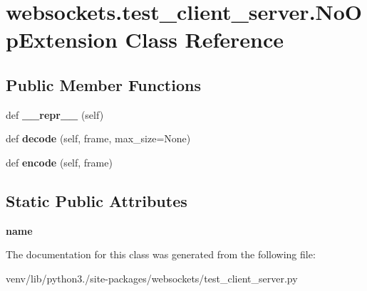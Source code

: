 \hypertarget{classwebsockets_1_1test__client__server_1_1_no_op_extension}{}\section{websockets.\+test\+\_\+client\+\_\+server.\+No\+Op\+Extension Class Reference}
\label{classwebsockets_1_1test__client__server_1_1_no_op_extension}
\subsection*{Public Member Functions}
\begin{DoxyCompactItemize}
\item 
\mbox{\label{classwebsockets_1_1test__client__server_1_1_no_op_extension_ad2e1f5664b59bcc5dd8af28bbd21e7e7}} 
def {\bfseries \+\_\+\+\_\+repr\+\_\+\+\_\+} (self)
\item 
\mbox{\label{classwebsockets_1_1test__client__server_1_1_no_op_extension_af09b1c01ae6027d4526010300760d39d}} 
def {\bfseries decode} (self, frame, max\+\_\+size=None)
\item 
\mbox{\label{classwebsockets_1_1test__client__server_1_1_no_op_extension_a6f7a2a6f5b87875ac4994dc9ef2e4f3e}} 
def {\bfseries encode} (self, frame)
\end{DoxyCompactItemize}
\subsection*{Static Public Attributes}
\begin{DoxyCompactItemize}
\item 
\mbox{\label{classwebsockets_1_1test__client__server_1_1_no_op_extension_a1c4adfda33c104b91adefd7960879fb5}} 
{\bfseries name}
\end{DoxyCompactItemize}


The documentation for this class was generated from the following file\+:\begin{DoxyCompactItemize}
\item 
venv/lib/python3./site-\/packages/websockets/test\+\_\+client\+\_\+server.\+py\end{DoxyCompactItemize}
